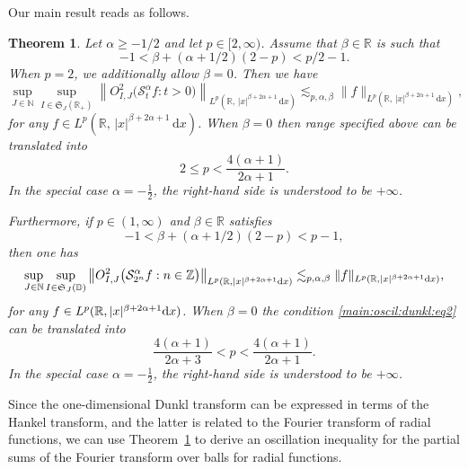 \documentclass[11pt,oneside]{amsart}
\numberwithin{equation}{section}
\newtheorem{theorem}[equation]{Theorem}
\theoremstyle{definition}
\newcommand{\DD}{\mathbb{D}}
\newcommand{\NN}{\mathbb{N}}
\newcommand{\RR}{\mathbb{R}}
\newcommand{\ZZ}{\mathbb{Z}}
\newcommand{\calS}{\mathcal{S}}
\begin{document}
Our main result reads as follows.
\begin{theorem}\label{main:oscil:dunkl}
Let $\alpha\geq-1/2$ and let $p\in[2,\infty)$. Assume that $\beta\in\RR$ is such that
\begin{equation*}
    -1<\beta+(\alpha+1/2)(2-p)<p/2-1.
\end{equation*}
When $p=2$, we additionally allow $\beta=0$. Then we have
\begin{equation*}
    \sup_{J \in \mathbb{N}} \sup_{I \in \mathfrak{S}_J(\mathbb{R}_+)} 
    \left\| O_{I, J}^2\big( \mathcal{S}_t^\alpha f : t > 0 \big) \right\|_{L^p(\mathbb{R},\, |x|^{\beta + 2\alpha + 1} \, \mathrm{d}x)} 
    \lesssim_{p, \alpha, \beta} 
    \| f \|_{L^p(\mathbb{R},\, |x|^{\beta + 2\alpha + 1} \, \mathrm{d}x)},
\end{equation*}
for any \( f \in L^p(\mathbb{R},\, |x|^{\beta + 2\alpha + 1} \, \mathrm{d}x) \).
 When $\beta=0$ then range specified above can be translated into
\begin{equation*}
    2\leq p<\frac{4(\alpha+1)}{2\alpha+1}.
\end{equation*}
In the special case \( \alpha = -\frac{1}{2} \), the right-hand side is understood to be \( +\infty \).

Furthermore, if $p\in(1,\infty)$ and $\beta\in\RR$ satisfies
\begin{equation}\label{main:oscil:dunkl:eq2}
    -1<\beta+(\alpha+1/2)(2-p)<p-1,
\end{equation}
then one has
\begin{equation*}
    \sup_{J\in\NN}\sup_{I\in\mathfrak{S}_J(\DD) }\big\|O_{I,J}^2\big(\calS_{2^n}^\alpha f:n\in\ZZ\big)\big\|_{L^p(\RR,|x|^{\beta+2\alpha+1}{\rm d}x)}\lesssim_{p,\alpha,\beta}\|f\|_{L^p(\RR,|x|^{\beta+2\alpha+1}{\rm d}x)},
\end{equation*}
for any $f\in L^p(\RR, |x|^{\beta+2\alpha+1}{\rm d}x)$. When $\beta=0$ the condition \eqref{main:oscil:dunkl:eq2} can be translated into
\begin{equation*}
    \frac{4(\alpha+1)}{2\alpha+3}< p<\frac{4(\alpha+1)}{2\alpha+1}.
\end{equation*}
In the special case \( \alpha = -\frac{1}{2} \), the right-hand side is understood to be \( +\infty \).
\end{theorem}
Since the one-dimensional Dunkl transform can be expressed in terms of the Hankel transform, and the latter is related to the Fourier transform of radial functions, we can use Theorem~\ref{main:oscil:dunkl} to derive an oscillation inequality for the partial sums of the Fourier transform over balls for radial functions.
\end{document}
